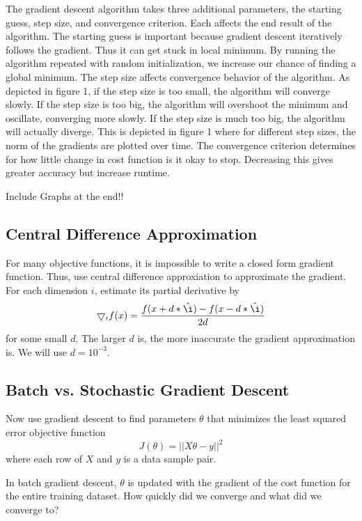\documentclass[a4paper,twoside]{article}
\begin{document}
The gradient descent algorithm takes three additional parameters, the starting guess, step size, and convergence criterion. Each affects the end result of the algorithm. The starting guess is important because gradient descent iteratively follows the gradient. Thus it can get stuck in local minimum. By running the algorithm repeated with random initialization, we increase our chance of finding a global minimum. The step size affects convergence behavior of the algorithm. As depicted in figure 1, if the step size is too small, the algorithm will converge slowly. If the step size is too big, the algorithm will overshoot the minimum and oscillate, converging more slowly. If the step size is much too big, the algorithm will actually diverge. This is depicted in figure 1 where for different step sizes, the norm of the gradients are plotted over time. The convergence criterion determines for how little change in cost function is it okay to stop. Decreasing this gives greater accuracy but increase runtime.

Include Graphs at the end!!

\subsection{Central Difference Approximation}

For many objective functions, it is impossible to write a closed form gradient function. Thus, use central difference approxiation to approximate the gradient. For each dimension $i$, estimate its partial derivative by 
\begin{equation}
\bigtriangledown_i f(x) = \frac{f(x+d*\hat{\i}) - f(x-d*\hat{\i})}{2d}
\end{equation}
for some small $d$. The larger $d$ is, the more inaccurate the gradient approximation is. We will use $d = 10^{-3}$.

\subsection{Batch vs. Stochastic Gradient Descent}
Now use gradient descent to find parameters $\theta$ that minimizes the least squared error objective function
\begin{equation}
J(\theta) = ||X\theta - y||^2
\end{equation}
where each row of $X$ and $y$ is a data sample pair. 

In batch gradient descent, $\theta$ is updated with the gradient of the cost function for the entire training dataset.
How quickly did we converge and what did we converge to? 
\end{document}
